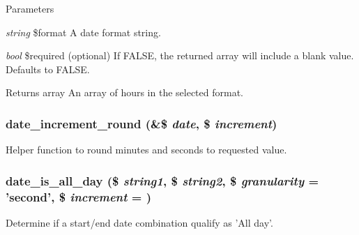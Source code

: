 \begin{DoxyParams}{Parameters}
\item[{\em string}]\$format A date format string. \item[{\em bool}]\$required (optional) If FALSE, the returned array will include a blank value. Defaults to FALSE.\end{DoxyParams}
\begin{DoxyReturn}{Returns}
array An array of hours in the selected format. 
\end{DoxyReturn}
\hypertarget{date__api_8module_aad7435d8e7bdaed55be4d4934436d35c}{
\subsubsection[{date\_\-increment\_\-round}]{\setlength{\rightskip}{0pt plus 5cm}date\_\-increment\_\-round (\&\$ {\em date}, \/  \$ {\em increment})}}
\label{date__api_8module_aad7435d8e7bdaed55be4d4934436d35c}
Helper function to round minutes and seconds to requested value. \hypertarget{date__api_8module_a7a70b1226d53abc183edbf3dd1d8e7c7}{
\subsubsection[{date\_\-is\_\-all\_\-day}]{\setlength{\rightskip}{0pt plus 5cm}date\_\-is\_\-all\_\-day (\$ {\em string1}, \/  \$ {\em string2}, \/  \$ {\em granularity} = {\ttfamily 'second'}, \/  \$ {\em increment} = {})}}
\label{date__api_8module_a7a70b1226d53abc183edbf3dd1d8e7c7}
Determine if a start/end date combination qualify as 'All day'.


